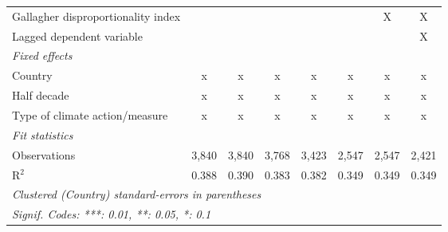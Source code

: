 \begin{tabular}{lccccccc}
   Gallagher disproportionality index                               &               &              &               &             &         & X       & X\\  
   Lagged dependent variable                                        &               &              &               &             &         &         & X\\  
   \emph{Fixed effects}\\
   Country                                                          & x             & x            & x             & x           & x       & x       & x\\  
   Half decade                                                      & x             & x            & x             & x           & x       & x       & x\\  
   Type of climate action/measure                                   & x             & x            & x             & x           & x       & x       & x\\  
   \midrule \emph{Fit statistics}\\
   Observations                                                     & 3,840         & 3,840        & 3,768         & 3,423       & 2,547   & 2,547   & 2,421\\  
   R$^2$                                                            & 0.388         & 0.390        & 0.383         & 0.382       & 0.349   & 0.349   & 0.349\\  
   \midrule
   \multicolumn{8}{l}{\emph{Clustered (Country) standard-errors in parentheses}}\\
   \multicolumn{8}{l}{\emph{Signif. Codes: ***: 0.01, **: 0.05, *: 0.1}}\\
\end{tabular}
\par\endgroup


